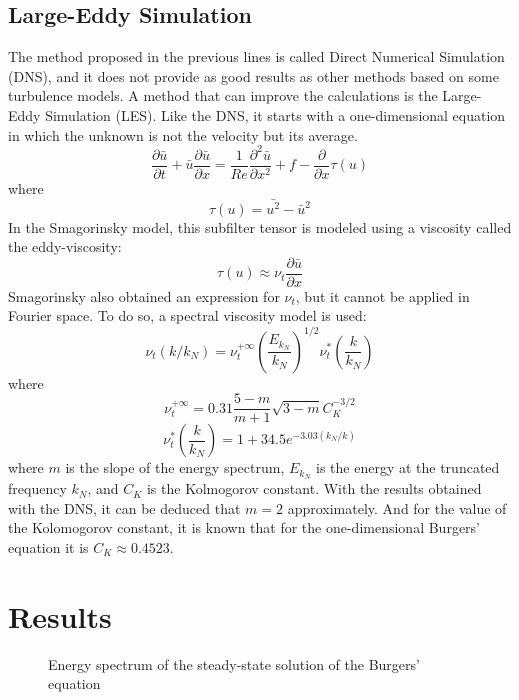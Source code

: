 \subsection{Large-Eddy Simulation}
The method proposed in the previous lines is called Direct Numerical Simulation (DNS), and it does not provide as good results as other methods based on some turbulence models. A method that can improve the calculations is the Large-Eddy Simulation (LES). Like the DNS, it starts with a one-dimensional equation in which the unknown is not the velocity but its average.
\begin{equation}
\frac{\partial\bar{u}}{\partial t}+\bar{u}\frac{\partial\bar{u}}{\partial x}=\frac{1}{Re}\frac{\partial^{2}\bar{u}}{\partial x^{2}}+f-\frac{\partial}{\partial x}\tau\left(u\right)
\end{equation}
where
\begin{equation}
\tau\left(u\right)=\bar{u^{2}}-\bar{u}^{2}
\end{equation}
In the Smagorinsky model, this subfilter tensor is modeled using a viscosity called the eddy-viscosity:
\begin{equation}
\tau\left(u\right)\approx\nu_{t}\frac{\partial\bar{u}}{\partial x}
\end{equation}
Smagorinsky also obtained an expression for $\nu_{t}$, but it cannot be applied in Fourier space. To do so, a spectral viscosity model is used:
\begin{equation}
\nu_{t}\left(k/k_{N}\right)=\nu_{t}^{+\infty}\left(\frac{E_{k_{N}}}{k_{N}}\right)^{1/2}\nu_{t}^{*}\left(\frac{k}{k_N}\right)
\end{equation}
where
\begin{equation}
\nu_{t}^{+\infty}=0.31\frac{5-m}{m+1}\sqrt{3-m}C_{K}^{-3/2}
\end{equation}
\begin{equation}
\nu_{t}^{*}\left(\frac{k}{k_{N}}\right)=1+34.5e^{-3.03\left(k_N/k\right)}
\end{equation}
where $m$ is the slope of the energy spectrum, $E_{k_{N}}$ is the energy at the truncated frequency $k_{N}$, and $C_{K}$ is the Kolmogorov constant. With the results obtained with the DNS, it can be deduced that $m=2$ approximately. And for the value of the Kolomogorov constant, it is known that for the one-dimensional Burgers' equation it is $C_{K}\approx0.4523$.

\section{Results}
\begin{figure}[h]
	\centering
	
	\caption{Energy spectrum of the steady-state solution of the Burgers' equation}
\end{figure}